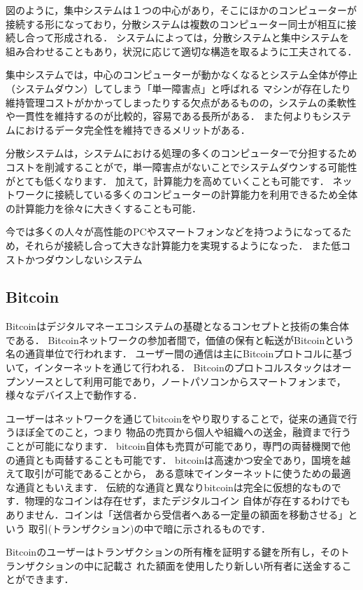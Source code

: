 \documentclass[a4paper,12pt]{jsarticle}
\begin{document}
図のように，集中システムは１つの中心があり，そこにほかのコンピューターが接続する形になっており，分散システムは複数のコンピューター同士が相互に接続し合って形成される．
システムによっては，分散システムと集中システムを組み合わせることもあり，状況に応じて適切な構造を取るように工夫されてる．

集中システムでは，中心のコンピューターが動かなくなるとシステム全体が停止（システムダウン）してしまう「単一障害点」と呼ばれる
マシンが存在したり維持管理コストがかかってしまったりする欠点があるものの，システムの柔軟性や一貫性を維持するのが比較的，容易である長所がある．
また何よりもシステムにおけるデータ完全性を維持できるメリットがある．

分散システムは，システムにおける処理の多くのコンピューターで分担するためコストを削減することがで，単一障害点がないことでシステムダウンする可能性がとても低くなります．
加えて，計算能力を高めていくことも可能です．
ネットワークに接続している多くのコンピューターの計算能力を利用できるため全体の計算能力を徐々に大きくすることも可能．

今では多くの人々が高性能のPCやスマートフォンなどを持つようになってるため，それらが接続し合って大きな計算能力を実現するようになった．
また低コストかつダウンしないシステム

\subsection{Bitcoin}
Bitcoinはデジタルマネーエコシステムの基礎となるコンセプトと技術の集合体である．
Bitcoinネットワークの参加者間で，価値の保有と転送がBitcoinという名の通貨単位で行われます．
ユーザー間の通信は主にBitcoinプロトコルに基づいて，インターネットを通じて行われる．
Bitcoinのプロトコルスタックはオープンソースとして利用可能であり，ノートパソコンからスマートフォンまで，様々なデバイス上で動作する．

ユーザーはネットワークを通じてbitcoinをやり取りすることで，従来の通貨で行うほぼ全てのこと，つまり
物品の売買から個人や組織への送金，融資まで行うことが可能になります．
bitcoin自体も売買が可能であり，専門の両替機関で他の通貨とも両替することも可能です．
bitcoinは高速かつ安全であり，国境を越えて取引が可能であることから，
ある意味でインターネットに使うための最適な通貨ともいえます．
伝統的な通貨と異なりbitcoinは完全に仮想的なものです．物理的なコインは存在せず，またデジタルコイン
自体が存在するわけでもありません．コインは「送信者から受信者へある一定量の額面を移動させる」という
取引(トランザクション)の中で暗に示されるものです．

Bitcoinのユーザーはトランザクションの所有権を証明する鍵を所有し，そのトランザクションの中に記載さ
れた額面を使用したり新しい所有者に送金することができます．
\end{document}
